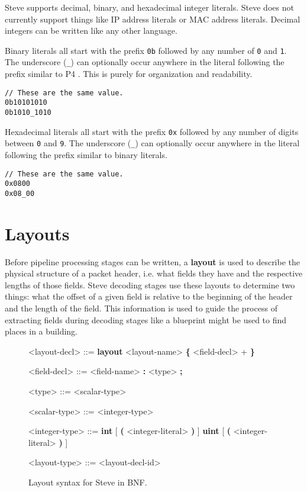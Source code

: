 Steve supports decimal, binary, and hexadecimal integer literals. Steve does not currently support things like IP address literals or MAC address literals. Decimal integers can be written like any other language.

Binary literals all start with the prefix \texttt{0b} followed by any number of \texttt{0} and \texttt{1}. The underscore (\texttt{\_}) can optionally occur anywhere in the literal following the prefix similar to P4 \cite{p4_spec}. This is purely for organization and readability.

\begin{lstlisting}
// These are the same value.
0b10101010
0b1010_1010
\end{lstlisting}

Hexadecimal literals all start with the prefix \texttt{0x} followed by any number of digits between \texttt{0} and \texttt{9}. The underscore (\texttt{\_}) can optionally occur anywhere in the literal following the prefix similar to binary literals.

\begin{lstlisting}
// These are the same value.
0x0800
0x08_00
\end{lstlisting}

\section{Layouts} \label{layout_tut}

Before pipeline processing stages can be written, a \textbf{layout} is used to describe the physical structure of a packet header, i.e. what fields they have and the respective lengths of those fields. Steve decoding stages use these layouts to determine two things: what the offset of a given field is relative to the beginning of the header and the length of the field. This information is used to guide the process of extracting fields during decoding stages like a blueprint might be used to find places in a building.

\begin{figure}[ht]
\begin{mdframed}
\begin{grammar}

<layout-decl> ::=
\textbf{layout} <layout-name> 
\textbf{\{}
	<field-decl> +
\textbf{\}}

<field-decl> ::=
<field-name> \textbf{:} <type> \textbf{;}

<type> ::=
<scalar-type>

<scalar-type> ::= <integer-type>

<integer-type> ::=
\textbf{int} [ \textbf{(} <integer-literal> \textbf{)} ]
\alt \textbf{uint} [ \textbf{(} <integer-literal> \textbf{)} ]

<layout-type> ::=
<layout-decl-id>

\end{grammar}
\end{mdframed}
\caption{Layout syntax for Steve in BNF.}
\label{fg:layout_syntax}
\end{figure}

